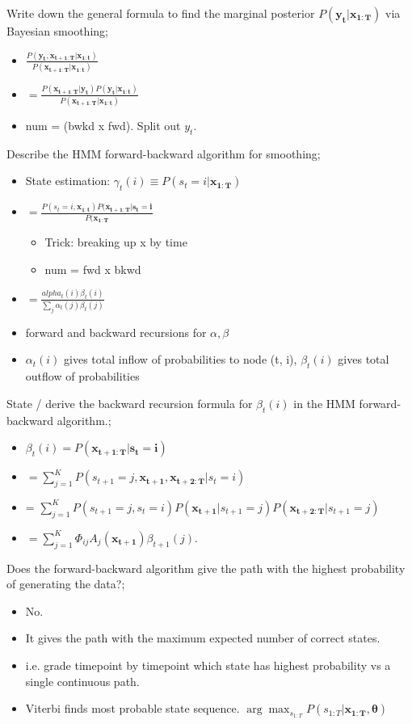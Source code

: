 \documentclass{article}
\begin{document}
Write down the general formula to find the marginal posterior $P(\mathbf{y_t|x_{1:T}})$ via Bayesian smoothing; \begin{itemize} \item $\frac{P(\mathbf{y_t, x_{t+1:T}|x_{1:t}})}{P(\mathbf{x_{t+1:T}|x_{1:t}})}$ \item $=\frac{P(\mathbf{x_{t+1:T}|y_t})P(\mathbf{y_t|x_{1:t}})}{P(\mathbf{x_{t+1:T}|x_{1:t}})}$ \item num = (bwkd x fwd). Split out $y_t$. \end{itemize}

Describe the HMM forward-backward algorithm for smoothing; \begin{itemize} \item State estimation: $\gamma_t(i)\equiv P(s_t=i|\mathbf{x_{1:T}})$ \item $=\frac{P(s_t=i, \mathbf{x_{1:t}})P(\mathbf{x_{t+1:T}|s_t=i}}{P(\mathbf{x_{1:T}}}$ \begin{itemize} \item Trick: breaking up x by time \item num = fwd x bkwd \end{itemize} \item $=\frac{alpha_t(i)\beta_t(i)}{\sum_j\alpha_t(j)\beta_t(j)}$ \item forward and backward recursions for $\alpha, \beta$ \item $\alpha_t(i)$ gives total inflow of probabilities to node (t, i), $\beta_t(i)$ gives total outflow of probabilities \end{itemize}

State / derive the backward recursion formula for $\beta_t(i)$ in the HMM forward-backward algorithm.; \begin{itemize} \item $\beta_t(i)=P(\mathbf{x_{t+1:T}|s_t=i})$ \item $=\sum_{j=1}^K P(s_{t+1}=j, \mathbf{x_{t+1},  x_{t+2:T}}|s_t=i)$ \item = $\sum_{j=1}^K P(s_{t+1}=j, s_t=i) P(\mathbf{x_{t+1}}|s_{t+1}=j)P(\mathbf{x_{t+2:T}}|s_{t+1}=j)$ \item $=\sum_{j=1}^K\Phi_{ij}A_j(\mathbf{x_{t+1}})\beta_{t+1}(j)$. \end{itemize}

Does the forward-backward algorithm give the path with the highest probability of generating the data?; \begin{itemize} \item No.  \item It gives the path with the maximum expected number of correct states. \item i.e. grade timepoint by timepoint which state has highest probability vs a single continuous path. \item Viterbi finds most probable state sequence. $\arg\max_{s_{1:T}}P(s_{1:T}|\mathbf{x_{1:T},\theta})$ \end{itemize}
\end{document}
